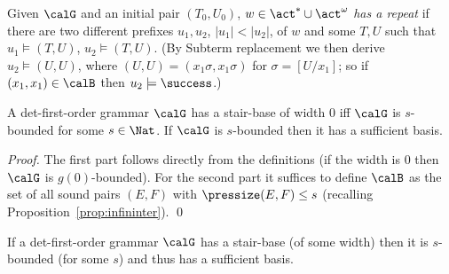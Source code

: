 \documentclass[12pt]{article}
\begin{document}
\begin{defn}\label{def:repeat}
Given $\calG$ and an initial pair $(T_0,U_0)$,
$w\in\act^*\cup\act^{\omega}$
\emph{has a repeat} if there are two
different prefixes $u_1, u_2$, $|u_1|<|u_2|$, of $w$  and some $T,U$ such that 
$u_1\models (T,U)$, $u_2\models (T,U)$.  
(By Subterm replacement we then derive
$u_2\models (U,U)$, where $(U,U)=(x_1\sigma,x_1\sigma)$ for
$\sigma=[U/x_1]$; so if $(x_1,x_1)\in\calB$ then
$u_2\models\success$.)
\end{defn}

\begin{prop}\label{prop:suffi}
A det-first-order grammar $\calG$ has a stair-base of width $0$ 
iff $\calG$ is $s$-bounded for some $s\in\Nat$.
If $\calG$ is $s$-bounded then it has a sufficient
basis.  
\end{prop}

\begin{proof}
The first part follows directly from the definitions (if the width is $0$ 
then $\calG$ is $g(0)$-bounded).
For the second part it suffices to define $\calB$ as
the set of all sound pairs $(E,F)$ with
$\pressize(E,F)\leq s$ (recalling Proposition~\ref{prop:infininter}).
\qed
\end{proof}



\begin{prop}\label{prop:secondsuf}
If  a det-first-order grammar $\calG$ has a stair-base (of some width)
then it is $s$-bounded (for some $s$)
and thus
has a sufficient basis.
\end{prop}
\end{document}
